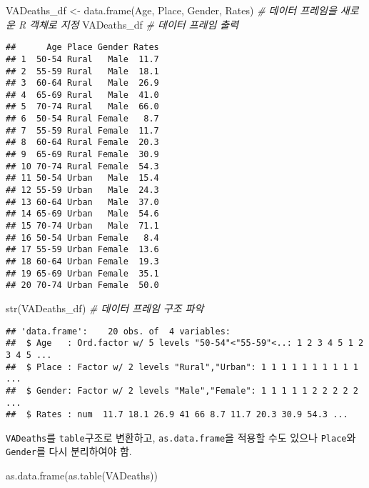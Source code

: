 \documentclass[
]{article}
\newenvironment{Shaded}{\begin{snugshade}}{\end{snugshade}}
\newcommand{\CommentTok}[1]{\textcolor[rgb]{0.56,0.35,0.01}{\textit{#1}}}
\newcommand{\FunctionTok}[1]{\textcolor[rgb]{0.00,0.00,0.00}{#1}}
\newcommand{\NormalTok}[1]{#1}
\newcommand{\OtherTok}[1]{\textcolor[rgb]{0.56,0.35,0.01}{#1}}
\begin{document}
\begin{Shaded}
\begin{Highlighting}[]
\NormalTok{VADeaths\_df }\OtherTok{\textless{}{-}} \FunctionTok{data.frame}\NormalTok{(Age, Place, Gender, Rates) }\CommentTok{\# 데이터 프레임을 새로운 R 객체로 지정 }
\NormalTok{VADeaths\_df }\CommentTok{\# 데이터 프레임 출력 }
\end{Highlighting}
\end{Shaded}

\begin{verbatim}
##      Age Place Gender Rates
## 1  50-54 Rural   Male  11.7
## 2  55-59 Rural   Male  18.1
## 3  60-64 Rural   Male  26.9
## 4  65-69 Rural   Male  41.0
## 5  70-74 Rural   Male  66.0
## 6  50-54 Rural Female   8.7
## 7  55-59 Rural Female  11.7
## 8  60-64 Rural Female  20.3
## 9  65-69 Rural Female  30.9
## 10 70-74 Rural Female  54.3
## 11 50-54 Urban   Male  15.4
## 12 55-59 Urban   Male  24.3
## 13 60-64 Urban   Male  37.0
## 14 65-69 Urban   Male  54.6
## 15 70-74 Urban   Male  71.1
## 16 50-54 Urban Female   8.4
## 17 55-59 Urban Female  13.6
## 18 60-64 Urban Female  19.3
## 19 65-69 Urban Female  35.1
## 20 70-74 Urban Female  50.0
\end{verbatim}

\begin{Shaded}
\begin{Highlighting}[]
\FunctionTok{str}\NormalTok{(VADeaths\_df) }\CommentTok{\# 데이터 프레임 구조 파악}
\end{Highlighting}
\end{Shaded}

\begin{verbatim}
## 'data.frame':    20 obs. of  4 variables:
##  $ Age   : Ord.factor w/ 5 levels "50-54"<"55-59"<..: 1 2 3 4 5 1 2 3 4 5 ...
##  $ Place : Factor w/ 2 levels "Rural","Urban": 1 1 1 1 1 1 1 1 1 1 ...
##  $ Gender: Factor w/ 2 levels "Male","Female": 1 1 1 1 1 2 2 2 2 2 ...
##  $ Rates : num  11.7 18.1 26.9 41 66 8.7 11.7 20.3 30.9 54.3 ...
\end{verbatim}

\texttt{VADeaths}를 \texttt{table}구조로 변환하고,
\texttt{as.data.frame}을 적용할 수도 있으나 \texttt{Place}와
\texttt{Gender}를 다시 분리하여야 함.

\begin{Shaded}
\begin{Highlighting}[]
\FunctionTok{as.data.frame}\NormalTok{(}\FunctionTok{as.table}\NormalTok{(VADeaths))}
\end{Highlighting}
\end{Shaded}
\end{document}
